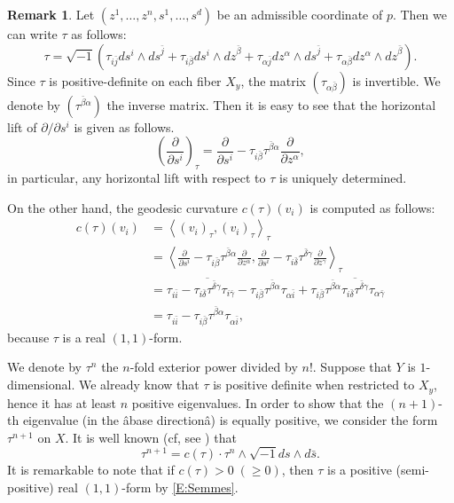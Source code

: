 \documentclass{amsart}
\theoremstyle{definition}
\newtheorem{remark}[theorem]{Remark}
\numberwithin{equation}{section}
\begin{document}
\begin{remark} \label{R:horizontal_lift}
Let $(z^1,\dots,z^n,s^1,\dots,s^d)$ be an admissible coordinate of $p$. Then we can write $\tau$ as follows:
\begin{equation*}
\tau
=
{\sqrt{-1}}{\left({\tau_{i\bar{j}}ds^i\wedge{ds}^{\bar{j}} 
+\tau_{i\bar\beta}ds^i\wedge{dz}^{\bar\beta} 
+\tau_{\alpha\bar{j}}dz^\alpha\wedge{ds}^{\bar{j}} 
+\tau_{\alpha\bar\beta}dz^\alpha\wedge{dz}^{\bar\beta}
}\right)}.
\end{equation*}
Since $\tau$ is positive-definite on each fiber $X_y$, the matrix $(\tau_{\alpha\bar\beta})$ is invertible. We denote by $(\tau^{\bar\beta\alpha})$ the inverse matrix. Then it is easy to see that the horizontal lift of $\partial/\partial{s^i}$ is given as follows.
\begin{equation*}
{\left({{\frac{\partial{}}{\partial{s^i}}}}\right)}_\tau
=
{\frac{\partial{}}{\partial{s^i}}}-\tau_{i\bar\beta}\tau^{\bar\beta\alpha}{\frac{\partial{}}{\partial{z^\alpha}}},
\end{equation*}
in particular, any horizontal lift with respect to $\tau$ is uniquely determined. 

On the other hand, the geodesic curvature $c(\tau)(v_i)$ is computed as follows:
\begin{equation} \label{E:function}
\begin{aligned}
c(\tau)(v_i)
&=
{\left\langle{{(v_i)_\tau,(v_i)_\tau}}\right\rangle}_\tau \\
&=
{\left\langle{{{\frac{\partial{}}{\partial{s^i}}}-\tau_{i\bar\beta}\tau^{\bar\beta\alpha}{\frac{\partial{}}{\partial{z^\alpha}}},
{\frac{\partial{}}{\partial{s^i}}}-\tau_{i\bar\delta}\tau^{\bar\delta\gamma}{\frac{\partial{}}{\partial{z^\gamma}}}
}}\right\rangle}_\tau \\
&=
\tau_{i\bar i}
-\overline{\tau_{i\bar\delta}\tau^{\bar\delta\gamma}}\tau_{i\bar\gamma}
-\tau_{i\bar\beta}\tau^{\bar\beta\alpha}\tau_{\alpha\bar i}
+\tau_{i\bar\beta}\tau^{\bar\beta\alpha}
\overline{\tau_{i\bar\delta}\tau^{\bar\delta\gamma}}\tau_{\alpha\bar\gamma} \\
&=
\tau_{i\bar i}
-\tau_{i\bar\beta}\tau^{\bar\beta\alpha}\tau_{\alpha\bar i},
\end{aligned}
\end{equation}
because $\tau$ is a real $(1,1)$-form.
\end{remark}
We denote by $\tau^n$ the $n$-fold exterior power divided by $n!$. Suppose that $Y$ is $1$-dimensional. We already know that $\tau$ is positive definite when restricted to $X_y$, hence it has at least $n$ positive eigenvalues. In order to show that the $(n+1)$-th eigenvalue (in the âbase directionâ) is equally positive, we consider the form $\tau^{n+1}$ on $X$.
It is well known (cf, see \cite{Semmes}) that 
\begin{equation}\label{E:Semmes}
\tau^{n+1}=c(\tau)\cdot \tau^n\wedge{\sqrt{-1}}{d}s\wedge{d}\bar{s}.
\end{equation}
It is remarkable to note that if $c(\tau)>0 \; (\ge0)$, then $\tau$ is a positive (semi-positive) real $(1,1)$-form by \eqref{E:Semmes}.
\end{document}
